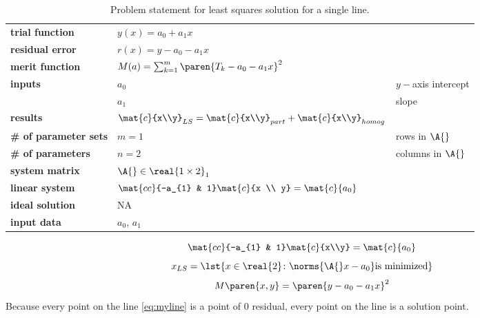   \begin{table}[h]  %
    \caption{Problem statement for least squares solution for a single line.}
    \begin{center}
      \begin{tabular}{lll}
        \bf{trial function} & $y(x) = a_{0} + a_{1} x$ \\
        \bf{residual error} & $r(x) = y - a_{0} - a_{1} x$ \\
        \bf{merit function} & $M(a) = \sum_{k=1}^{m}\paren{T_{k} - a_{0} - a_{1} x}^{2}$\\
        \bf{inputs}         & $a_{0}$ & $y-$axis intercept \\
                            & $a_{1}$ & slope \\
        \bf{results}        & $\mat{c}{x\\y}_{LS} = \mat{c}{x\\y}_{part} + \mat{c}{x\\y}_{homog}$   \\
        \bf{\# of parameter sets} & $m = 1$ & rows in $\A{}$ \\
        \bf{\# of parameters}   & $n = 2$ & columns in $\A{}$ \\
        \bf{system matrix}  & $\A{} \in \real{1 \times 2}_{1}$ \\
        \bf{linear system}  & $\mat{cc}{-a_{1} & 1} 
                               \mat{c}{x \\ y} = 
                               \mat{c}{a_{0}}$ \\
        \bf{ideal solution} & NA \\
        \bf{input data}     & $a_{0}$, $a_{1}$
      \end{tabular}
    \end{center}
  \label{tab:bevington inputs}
  \end{table}%

  \begin{equation*}   %
      \mat{cc}{-a_{1} & 1} 
      \mat{c}{x\\y} =
      \mat{c}{a_{0}}
  \end{equation*}
  \begin{equation*}   %
      x_{LS} = \lst{x\in\real{2}\colon \norms{\A{}x - a_{0}} \text{is minimized}}
  \end{equation*}
  \begin{equation*}   %
      M\paren{x,y} = \paren{y - a_{0} - a_{1} x}^{2}
  \end{equation*}
Because every point on the line \eqref{eq:myline} is a point of 0 residual, every point on the line is a solution point. 


